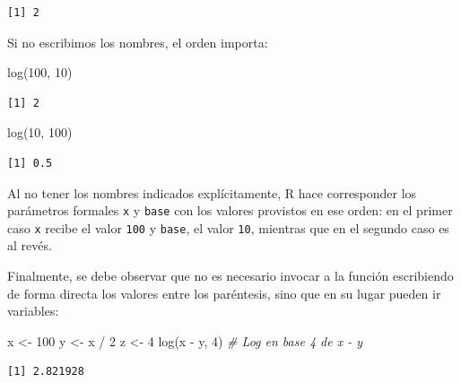 \documentclass[
]{book}
\newenvironment{Shaded}{\begin{snugshade}}{\end{snugshade}}
\newcommand{\CommentTok}[1]{\textcolor[rgb]{0.56,0.35,0.01}{\textit{#1}}}
\newcommand{\DecValTok}[1]{\textcolor[rgb]{0.00,0.00,0.81}{#1}}
\newcommand{\FunctionTok}[1]{\textcolor[rgb]{0.00,0.00,0.00}{#1}}
\newcommand{\NormalTok}[1]{#1}
\newcommand{\OtherTok}[1]{\textcolor[rgb]{0.56,0.35,0.01}{#1}}
\newcommand{\SpecialCharTok}[1]{\textcolor[rgb]{0.00,0.00,0.00}{#1}}
\begin{document}
\begin{verbatim}
[1] 2
\end{verbatim}

Si no escribimos los nombres, el orden importa:

\begin{Shaded}
\begin{Highlighting}[]
\FunctionTok{log}\NormalTok{(}\DecValTok{100}\NormalTok{, }\DecValTok{10}\NormalTok{)}
\end{Highlighting}
\end{Shaded}

\begin{verbatim}
[1] 2
\end{verbatim}

\begin{Shaded}
\begin{Highlighting}[]
\FunctionTok{log}\NormalTok{(}\DecValTok{10}\NormalTok{, }\DecValTok{100}\NormalTok{)}
\end{Highlighting}
\end{Shaded}

\begin{verbatim}
[1] 0.5
\end{verbatim}

Al no tener los nombres indicados explícitamente, R hace corresponder los parámetros formales \texttt{x} y \texttt{base} con los valores provistos en ese orden: en el primer caso \texttt{x} recibe el valor \texttt{100} y \texttt{base}, el valor \texttt{10}, mientras que en el segundo caso es al revés.

Finalmente, se debe observar que no es necesario invocar a la función escribiendo de forma directa los valores entre los paréntesis, sino que en su lugar pueden ir variables:

\begin{Shaded}
\begin{Highlighting}[]
\NormalTok{x }\OtherTok{\textless{}{-}} \DecValTok{100}
\NormalTok{y }\OtherTok{\textless{}{-}}\NormalTok{ x }\SpecialCharTok{/} \DecValTok{2}
\NormalTok{z }\OtherTok{\textless{}{-}} \DecValTok{4}
\FunctionTok{log}\NormalTok{(x }\SpecialCharTok{{-}}\NormalTok{ y, }\DecValTok{4}\NormalTok{)       }\CommentTok{\# Log en base 4 de x {-} y}
\end{Highlighting}
\end{Shaded}

\begin{verbatim}
[1] 2.821928
\end{verbatim}
\end{document}
